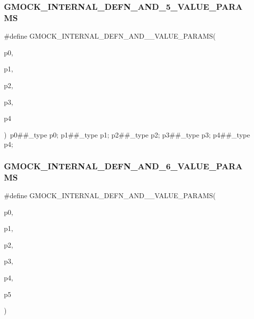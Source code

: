 \subsubsection{\texorpdfstring{GMOCK\_INTERNAL\_DEFN\_AND\_5\_VALUE\_PARAMS}{GMOCK\_INTERNAL\_DEFN\_AND\_5\_VALUE\_PARAMS}}
{\footnotesize\ttfamily \#define G\+M\+O\+C\+K\+\_\+\+I\+N\+T\+E\+R\+N\+A\+L\+\_\+\+D\+E\+F\+N\+\_\+\+A\+N\+D\+\_\+\_\+\+V\+A\+L\+U\+E\+\_\+\+P\+A\+R\+A\+MS(\begin{DoxyParamCaption}\item[{}]{p0,  }\item[{}]{p1,  }\item[{}]{p2,  }\item[{}]{p3,  }\item[{}]{p4 }\end{DoxyParamCaption})~p0\#\#\+\_\+type p0; p1\#\#\+\_\+type p1; p2\#\#\+\_\+type p2; p3\#\#\+\_\+type p3; p4\#\#\+\_\+type p4;}

\mbox{\label{googletest-master_2googlemock_2include_2gmock_2gmock-generated-actions_8h_a4ba5920542abfa689a6517d21eb8860a}} 
\subsubsection{\texorpdfstring{GMOCK\_INTERNAL\_DEFN\_AND\_6\_VALUE\_PARAMS}{GMOCK\_INTERNAL\_DEFN\_AND\_6\_VALUE\_PARAMS}}
{\footnotesize\ttfamily \#define G\+M\+O\+C\+K\+\_\+\+I\+N\+T\+E\+R\+N\+A\+L\+\_\+\+D\+E\+F\+N\+\_\+\+A\+N\+D\+\_\+\_\+\+V\+A\+L\+U\+E\+\_\+\+P\+A\+R\+A\+MS(\begin{DoxyParamCaption}\item[{}]{p0,  }\item[{}]{p1,  }\item[{}]{p2,  }\item[{}]{p3,  }\item[{}]{p4,  }\item[{}]{p5 }\end{DoxyParamCaption})}

